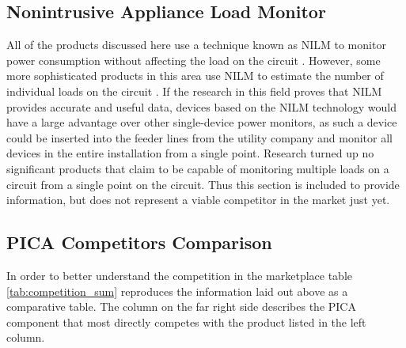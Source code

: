 \subsection{Nonintrusive Appliance Load Monitor} %
All of the products discussed here use a technique known as \ac{NILM} to monitor power consumption without affecting the load on the circuit \cite{NILM}. However, some more sophisticated products in this area use \ac{NILM} to estimate the number of individual loads on the circuit \cite{NALM}. If the research in this field proves that \ac{NILM} provides accurate and useful data, devices based on the \ac{NILM} technology would have a large advantage over other single-device power monitors, as such a device could be inserted into the feeder lines from the utility company and monitor all devices in the entire installation from a single point. Research turned up no significant products that claim to be capable of monitoring multiple loads on a circuit from a single point on the circuit. Thus this section is included to provide information, but does not represent a viable competitor in the market just yet.

\subsection{PICA Competitors Comparison} %
In order to better understand the competition in the marketplace table \ref{tab:competition_sum} reproduces the information laid out above as a comparative table. The column on the far right side describes the PICA component that most directly competes with the product listed in the left column.

